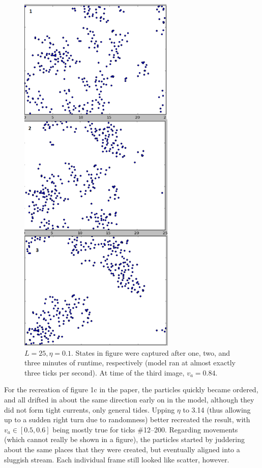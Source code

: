 \documentclass{article}
\begin{document}
\begin{figure}[ht]
  \centering \includegraphics[height=7in]{2015-12-16_state_lowrho.png}
  \caption{\label{fig:state_lowrho} $L=25, \eta=0.1$.  States in figure were
    captured after one, two, and three minutes of runtime, respectively (model
    ran at almost exactly three ticks per second).  At time of the third image,
    $v_a=0.84$.}
\end{figure}

For the recreation of figure 1c in the paper, the particles quickly became
ordered, and all drifted in about the same direction early on in the model,
although they did not form tight currents, only general tides.  Upping $\eta$ to
3.14 (thus allowing up to a sudden right turn due to randomness) better
recreated the result, with $v_a\in[0.5,0.6]$ being mostly true for ticks
\#12--200.  Regarding movements (which cannot really be shown in a figure), the
particles started by juddering about the same places that they were created, but
eventually aligned into a sluggish stream.  Each individual frame still looked
like scatter, however.
\end{document}
